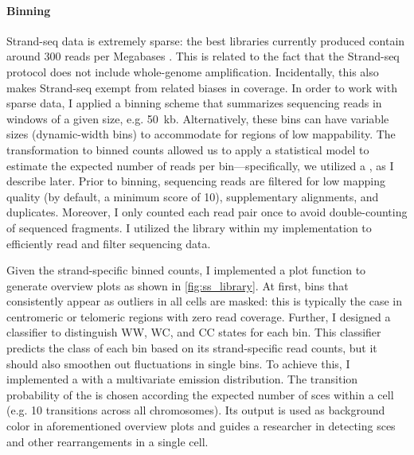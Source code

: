 \paragraph{Binning}
Strand-seq data is extremely sparse: the best libraries currently produced
contain around 300 reads per Megabases \citep{Chaisson2017,Sanders2017}.
This is related to the fact that the Strand-seq protocol does not include
whole-genome amplification. Incidentally, this also makes Strand-seq exempt
from related biases in coverage. In
order to work with sparse data, I applied a binning scheme that summarizes
sequencing reads in windows of a given size, e.g. 50~kb. Alternatively, these
bins can have variable sizes (dynamic-width bins) to accommodate for regions of
low mappability. The transformation to binned counts allowed us to apply a
statistical model to estimate the expected number of reads per
bin---specifically, we utilized a ,
as I describe
later. Prior to binning, sequencing reads are filtered for low mapping quality
(by default, a minimum score of 10), supplementary alignments, and \pcr duplicates.
Moreover, I only counted each read pair once to avoid double-counting of
sequenced fragments. I utilized the \htslib library within my implementation
to efficiently read and filter sequencing data.

Given the strand-specific binned counts, I implemented a plot function to
generate overview plots as shown in \cref{fig:ss_library}. At first, bins that
consistently appear as outliers in all cells are masked: this is typically the
case in centromeric or telomeric regions with zero read coverage. Further, I designed a classifier to
distinguish WW, WC, and CC states for each bin. This classifier predicts
the class of each bin based on its strand-specific read counts, but it
should also smoothen out fluctuations in single bins.
To achieve this, I implemented a \hmm with a multivariate \nb
emission distribution. The transition probability of the \hmm is chosen
according the expected number of \acp{sce} within a cell (e.g. 10 transitions
across all chromosomes). Its output is used as background color in
aforementioned overview plots and guides a researcher in detecting \acp{sce} and
other rearrangements in a single cell.

